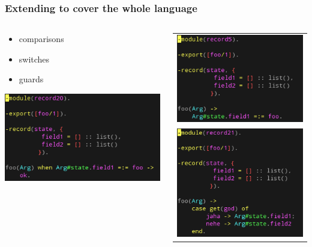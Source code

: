 \begin{frame}
\frametitle{Extending to cover the whole language}

\begin{columns}
\begin{column}[l]{3.5cm}

	\begin{block}{}
		\begin{itemize}
			\item \scriptsize{comparisons}
			\item \scriptsize{switches}
			\item \scriptsize{guards}
		\end{itemize}
	\end{block}

	\includegraphics[scale=0.4]{../figures/test20}

\end{column}

\begin{column}[r]{6.5cm}
\begin{tabular}{ c }
  	\includegraphics[scale=0.4]{../figures/test5}
\\
	\includegraphics[scale=0.4]{../figures/test21}
\end{tabular}
\end{column}
\end{columns}

\end{frame}

